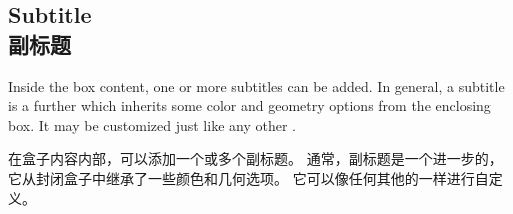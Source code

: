 \subsection{Subtitle\\副标题}

Inside the box content, one or more subtitles can be added.
In general, a subtitle is a further  which inherits some color and geometry options from the enclosing box. 
It may be customized just like any other .


在盒子内容内部，可以添加一个或多个副标题。 通常，副标题是一个进一步的，它从封闭盒子中继承了一些颜色和几何选项。 它可以像任何其他的一样进行自定义。

